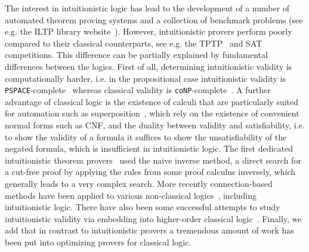 \documentclass[runningheads]{llncs}
\begin{document}
The interest in intuitionistic logic has lead to the development of a number of automated theorem proving systems and a collection of benchmark problems (see e.g. the ILTP library website~\cite{iltp}).
However, intuitionistic provers perform poorly compared to their classical counterparts, see e.g. the TPTP~\cite{casc} and SAT~\cite{satc} competitions.
This difference can be partially explained by fundamental differences between the logics.
First of all, determining intuitionistic validity is computationally harder, i.e. in the propositional case intuitionistic validity is \verb+PSPACE+-complete~\cite{statman1979intuitionistic} whereas classical validity is \verb+coNP+-complete~\cite{cook1971complexity}.
A further advantage of classical logic is the existence of calculi that are particularly suited for automation such as superposition~\cite{bachmair2001resolution}, which rely on the existence of convenient normal forms such as CNF, and the duality between validity and satisfiability, i.e. to show the validity of a formula it suffices to show the unsatisfiability of the negated formula, which is insufficient in intuitionistic logic.
The first dedicated intuitionistic theorem provers~\cite{mclaughlin2009efficient,tammet1996resolution} used the naive inverse method, a direct search for a cut-free proof by applying the rules from some proof calculus inversely, which generally leads to a very complex search. More recently connection-based methods have been applied to various non-classical logics~\cite{otten2005clausal,otten2021nanocop}, including intuitionistic logic.
There have also been some successful attempts to study intuitionistic validity via embedding into higher-order classical logic~\cite{LEO}.
Finally, we add that in contrast to intuitionistic provers a tremendous amount of work has been put into optimizing provers for classical logic.
\end{document}
